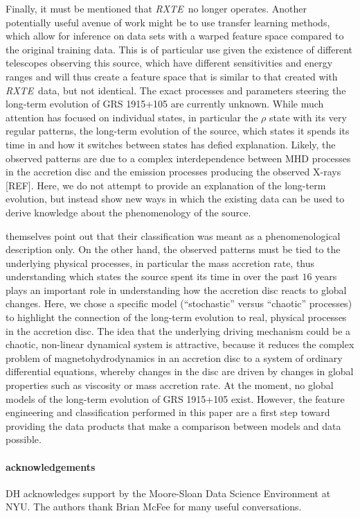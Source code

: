 \documentclass[12pt]{emulateapj}
\newcommand{\project}[1]{\textsl{#1}}
\newcommand{\rxte}{\project{RXTE}}
\begin{document}
Finally, it must be mentioned that \rxte\ no longer operates. Another potentially useful avenue of work might be to use transfer learning methods, which allow 
for inference on data sets with a warped feature space compared to the original training data. This is of particular use given the existence of different telescopes 
observing this source, which have different sensitivities and energy ranges and will thus create a feature space that is similar to that created with \rxte\ data, but 
not identical.
The exact processes and parameters steering the long-term evolution of GRS 1915+105 are currently unknown. While much attention has focused on 
individual states, in particular the $\rho$ state with its very regular patterns, the long-term evolution of the source, which states it spends its time in and how 
it switches between states has defied explanation. Likely, the observed patterns are due to a complex interdependence between MHD processes in the accretion 
disc and the emission processes producing the observed X-rays [REF]. Here, we do not attempt to provide an explanation of the long-term evolution, but instead show 
new ways in which the existing data can be used to derive knowledge about the phenomenology of the source.

\citet{belloni2000} themselves point out that their classification was meant as a phenomenological description only. On the other hand, the observed patterns 
must be tied to the underlying physical processes, in particular the mass accretion rate, thus understanding which states the source spent its time in over the 
past $16$ years plays an important role in understanding how the accretion disc reacts to global changes. Here, we chose a specific model (``stochastic'' versus 
``chaotic'' processes) to highlight the connection of the long-term evolution to real, physical processes in the accretion disc. The idea that the underlying driving 
mechanism could be a chaotic, non-linear dynamical system is attractive, %
because it reduces the complex problem of magnetohydrodynamics in an 
accretion disc to a system of ordinary differential equations, whereby changes in the disc are driven by changes in global properties such as viscosity or mass 
accretion rate. At the moment, no global models of the long-term evolution of GRS 1915+105 exist. However, the feature engineering and classification performed 
in this paper are a first step toward providing the data products that make a comparison between models and data possible.

\paragraph{acknowledgements}
DH acknowledges support by the Moore-Sloan Data Science Environment at NYU. The authors thank Brian McFee for many useful conversations.



\end{document}
